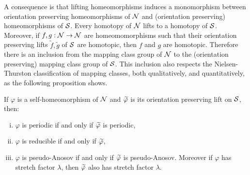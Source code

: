 A consequence is that lifting homeomorphisms induces a monomorphism between orientation preserving homeomorphisms of $\mathcal{N}$ and (orientation preserving) homeomorphisms of $\mathcal{S}$.  Every homotopy of $\mathcal{N}$ lifts to a homotopy of $\mathcal{S}$.  Moreover, if $f,g:\mathcal{N}\to\mathcal{N}$ are homeomomorphisms such that their orientation preserving lifts $\widetilde{f},\widetilde{g}$ of $\mathcal{S}$ are homotopic, then $f$ and $g$ are homotopic.  Therefore there is an inclusion from the mapping class group of $\mathcal{N}$ to the (orientation preserving) mapping class group of $\mathcal{S}$.  This inclusion also respects the Nielsen-Thurston classification of mapping classes, both qualitatively, and
quantitatively, as the following proposition shows.
\begin{prop}
  \label{prop:2}
  If $\varphi$ is a self-homeomorphism of $\mathcal{N}$ and $\widetilde{\varphi}$ is its orientation preserving lift on $\mathcal{S}$, then:
  \begin{enumerate}[(i)]
  \item $\varphi$ is periodic if and only if $\widetilde{\varphi}$ is periodic,
  \item $\varphi$ is reducible if and only if $\widetilde{\varphi}$, 
  \item $\varphi$ is pseudo-Anosov if and only if $\widetilde{\varphi}$ is pseudo-Anosov.  Moreover if $\varphi$ has stretch factor $\lambda$, then $\widetilde{\varphi}$ also has stretch factor $\lambda$.
  \end{enumerate}
\end{prop}
